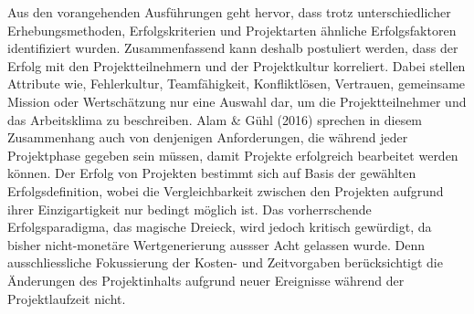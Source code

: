 \newline Aus den vorangehenden Ausführungen geht hervor, dass trotz unterschiedlicher Erhebungsmethoden, Erfolgskriterien und Projektarten ähnliche Erfolgsfaktoren identifiziert wurden. Zusammenfassend kann deshalb postuliert werden, dass der Erfolg mit den Projektteilnehmern und der Projektkultur korreliert. Dabei stellen Attribute wie, Fehlerkultur, Teamfähigkeit, Konfliktlösen, Vertrauen, gemeinsame Mission oder Wertschätzung nur eine Auswahl dar, um die Projektteilnehmer und das Arbeitsklima zu beschreiben. Alam \& Gühl (2016) sprechen in diesem Zusammenhang auch von denjenigen Anforderungen, die während jeder Projektphase gegeben sein müssen, damit Projekte erfolgreich bearbeitet werden können. Der Erfolg von Projekten bestimmt sich auf Basis der gewählten Erfolgsdefinition, wobei die Vergleichbarkeit zwischen den Projekten aufgrund ihrer Einzigartigkeit nur bedingt möglich ist. Das vorherrschende Erfolgsparadigma, das magische Dreieck, wird jedoch kritisch gewürdigt, da bisher nicht-monetäre Wertgenerierung aussser Acht gelassen wurde. Denn ausschliessliche Fokussierung der Kosten- und Zeitvorgaben berücksichtigt die Änderungen des Projektinhalts aufgrund neuer Ereignisse während der Projektlaufzeit  nicht.
